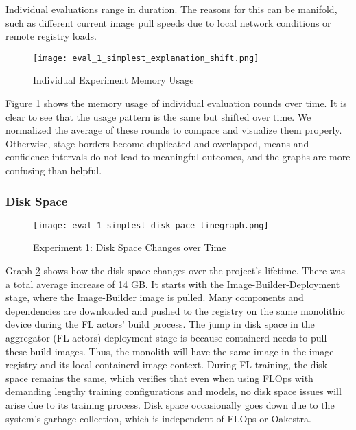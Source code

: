 Individual evaluations range in duration.
The reasons for this can be manifold, such as different current image pull speeds due to local network conditions or remote registry loads.
\begin{figure}[h]
    \begin{adjustwidth}{-0.2\paperwidth}{-0.2\paperwidth}
        \centering
        \texttt{[image: eval\_1\_simplest\_explanation\_shift.png]}
        \caption{Individual Experiment Memory Usage}
        \label{fig:eval_1_simplest_explanation_shift}
    \end{adjustwidth}
\end{figure}
Figure \ref{fig:eval_1_simplest_explanation_shift} shows the memory usage of individual evaluation rounds over time.
It is clear to see that the usage pattern is the same but shifted over time.
We normalized the average of these rounds to compare and visualize them properly.
Otherwise, stage borders become duplicated and overlapped, means and confidence intervals do not lead to meaningful outcomes, and the graphs are more confusing than helpful.

\pagebreak
\subsubsection{Disk Space}

\begin{figure}[h]
    \begin{adjustwidth}{-0.2\paperwidth}{-0.2\paperwidth}
        \centering
        \texttt{[image: eval\_1\_simplest\_disk\_pace\_linegraph.png]}
        \caption{Experiment 1: Disk Space Changes over Time}
        \label{fig:eval_1_simplest_disk_space}
    \end{adjustwidth}
\end{figure}

Graph \ref{fig:eval_1_simplest_disk_space} shows how the disk space changes over the project's lifetime.
There was a total average increase of 14 GB.
It starts with the Image-Builder-Deployment stage, where the Image-Builder image is pulled.
Many components and dependencies are downloaded and pushed to the registry on the same monolithic device during the FL actors' build process.
The jump in disk space in the aggregator (FL actors) deployment stage is because containerd needs to pull these build images.
Thus, the monolith will have the same image in the image registry and its local containerd image context.
During FL training, the disk space remains the same, which verifies that even when using FLOps with demanding lengthy training configurations and models, no disk space issues will arise due to its training process.
Disk space occasionally goes down due to the system's garbage collection, which is independent of FLOps or Oakestra.

